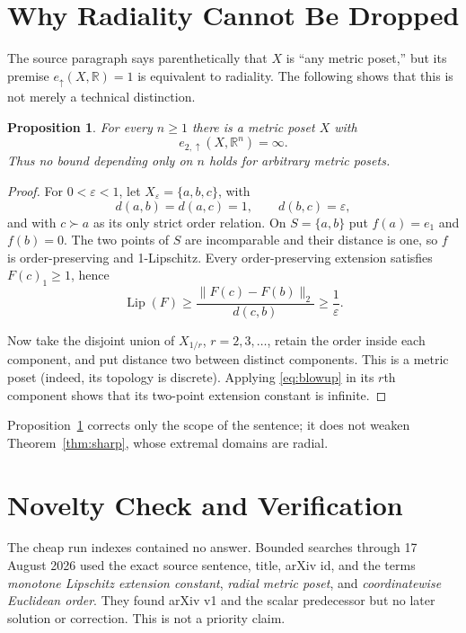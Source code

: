 \documentclass[11pt]{article}
\newtheorem{proposition}{Proposition}
\newcommand{\R}{\mathbb R}
\newcommand{\Lip}{\operatorname{Lip}}
\begin{document}
\section*{Why Radiality Cannot Be Dropped}

The source paragraph says parenthetically that $X$ is ``any metric poset,''
but its premise $e_\uparrow(X,\R)=1$ is equivalent to radiality.  The
following shows that this is not merely a technical distinction.

\begin{proposition}\label{prop:unbounded}
For every $n\geq1$ there is a metric poset $X$ with
\[
 e_{2,\uparrow}(X,\R^n)=\infty.
\]
Thus no bound depending only on $n$ holds for arbitrary metric posets.
\end{proposition}

\begin{proof}
For $0<\varepsilon<1$, let $X_\varepsilon=\{a,b,c\}$, with
\[
 d(a,b)=d(a,c)=1,\qquad d(b,c)=\varepsilon,
\]
and with $c\succ a$ as its only strict order relation.  On $S=\{a,b\}$ put
$f(a)=e_1$ and $f(b)=0$.  The two points of $S$ are incomparable and their
distance is one, so $f$ is order-preserving and 1-Lipschitz.  Every
order-preserving extension satisfies $F(c)_1\geq1$, hence
\[
 \Lip(F)\geq
 \frac{\|F(c)-F(b)\|_2}{d(c,b)}\geq\frac1\varepsilon.
 \tag{3}\label{eq:blowup}
\]

Now take the disjoint union of $X_{1/r}$, $r=2,3,\ldots$, retain the order
inside each component, and put distance two between distinct components.
This is a metric poset (indeed, its topology is discrete).  Applying
\eqref{eq:blowup} in its $r$th component shows that its two-point extension
constant is infinite.
\end{proof}

Proposition~\ref{prop:unbounded} corrects only the scope of the sentence; it
does not weaken Theorem~\ref{thm:sharp}, whose extremal domains are radial.

\section*{Novelty Check and Verification}

The cheap run indexes contained no answer.  Bounded searches through
17 August 2026 used the exact source sentence, title, arXiv id, and the terms
\emph{monotone Lipschitz extension constant}, \emph{radial metric poset},
and \emph{coordinatewise Euclidean order}.  They found arXiv v1 and the
scalar predecessor but no later solution or correction.  This is not a
priority claim.
\end{document}
